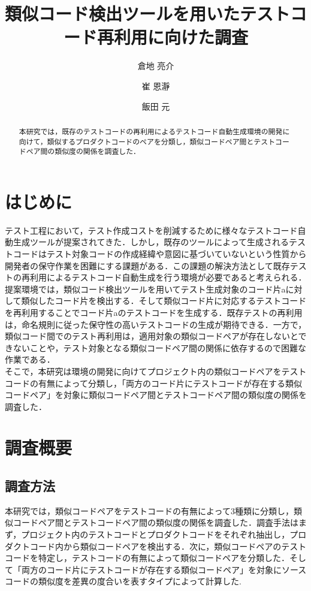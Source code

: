 \documentclass{fose2019}           %
\title{類似コード検出ツールを用いたテストコード再利用に向けた調査}
\author{倉地 亮介}{Ryosuke Kurachi, 奈良先端科学技術大学院大学}
\author{崔 恩瀞}{Eunjong Choi, 京都工芸繊維大学}
\author{飯田 元}{Hajimu Iida, 奈良先端科学技術大学院大学}
\begin{document}
\maketitle


\begin{abstract}
本研究では，既存のテストコードの再利用によるテストコード自動生成環境の開発に向けて，類似するプロダクトコードのペアを分類し，類似コードペア間とテストコードペア間の類似度の関係を調査した．
\end{abstract}

\section{はじめに}
テスト工程において，テスト作成コストを削減するために様々なテストコード自動生成ツールが提案されてきた．しかし，既存のツールによって生成されるテストコードはテスト対象コードの作成経緯や意図に基づいていないという性質から開発者の保守作業を困難にする課題がある\cite{ICST}．この課題の解決方法として既存テストの再利用によるテストコード自動生成を行う環境が必要であると考えられる．
\\\indent 提案環境では，類似コード検出ツールを用いてテスト生成対象のコード片aに対して類似したコード片を検出する．そして類似コード片に対応するテストコードを再利用することでコード片aのテストコードを生成する．既存テストの再利用は，命名規則に従った保守性の高いテストコードの生成が期待できる．一方で，類似コード間でのテスト再利用は，適用対象の類似コードペアが存在しないとできないことや，テスト対象となる類似コードペア間の関係に依存するので困難な作業である．
\\\indent そこで，本研究は環境の開発に向けてプロジェクト内の類似コードペアをテストコードの有無によって分類し，「両方のコード片にテストコードが存在する類似コードペア」を対象に類似コードペア間とテストコードペア間の類似度の関係を調査した．

\section{調査概要}
\subsection{調査方法}
本研究では，類似コードペアをテストコードの有無によって3種類に分類し，類似コードペア間とテストコードペア間の類似度の関係を調査した．調査手法はまず，プロジェクト内のテストコードとプロダクトコードをそれぞれ抽出し，プロダクトコード内から類似コードペアを検出する\cite{ICPC}．次に，類似コードペアのテストコードを特定し，テストコードの有無によって類似コードペアを分類した．そして「両方のコード片にテストコードが存在する類似コードペア」を対象にソースコードの類似度を差異の度合いを表すタイプ\cite{SCP}によって計算した.
\end{document}

